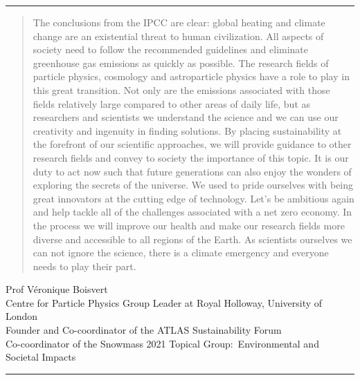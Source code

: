 \documentclass[../SustainableHEP.tex]{subfiles}
\begin{document}
\textcolor{Pythongreen}{\rule{2cm}{3pt}}

\begin{quotation}
The conclusions from the IPCC are clear: global heating and climate change are an existential threat to human civilization. All aspects of society need to follow the recommended guidelines and eliminate greenhouse gas emissions as quickly as possible. The research fields of particle physics, cosmology and astroparticle physics have a role to play in this great transition. Not only are the emissions associated with those fields relatively large compared to other areas of daily life, but as researchers and scientists we understand the science and we can use our creativity and ingenuity in finding solutions. By placing sustainability at the forefront of our scientific approaches, we will provide guidance to other research fields and convey to society the importance of this topic. It is our duty to act now such that future generations can also enjoy the wonders of exploring the secrets of the universe. We used to pride ourselves with being great innovators at the cutting edge of technology. Let’s be ambitious again and help tackle all of the challenges associated with a net zero economy. In the process we will improve our health and make our research fields more diverse and accessible to all regions of the Earth. As scientists ourselves we can not ignore the science, there is a climate emergency and everyone needs to play their part.
\end{quotation}
\begin{flushleft}
Prof V\'{e}ronique Boisvert\\
Centre for Particle Physics Group Leader at Royal Holloway, University of London\\
Founder and Co-coordinator of the ATLAS Sustainability Forum\\
Co-coordinator of the Snowmass 2021 Topical Group:\ Environmental and Societal Impacts
\end{flushleft}

\textcolor{Pythongreen}{\rule{2cm}{3pt}}
\end{document}
